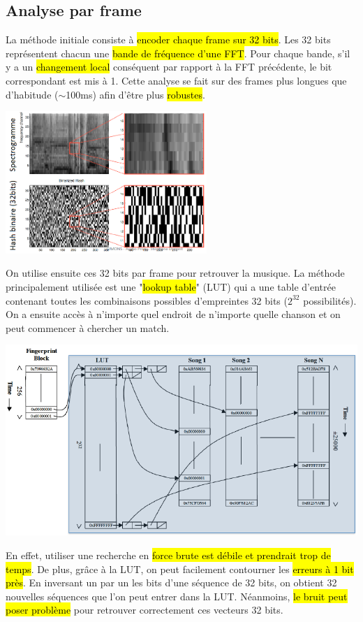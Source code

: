 \documentclass[letterpaper, 12pt]{article}
\newcommand{\alinea}{
\hspace*{0.5cm}}
\begin{document}
		\subsection{Analyse par frame}
			\alinea La méthode initiale consiste à \hl{encoder chaque frame sur 32 bits}. Les 32 bits représentent chacun une \hl{bande 
				de fréquence d'une FFT}. Pour chaque bande, s'il y a un \hl{changement local} conséquent par rapport à la FFT précédente, le 
				bit correspondant est mis à 1. Cette analyse se fait sur des frames plus longues que d'habitude ($\sim$100ms) afin 
				d'être plus \hl{robustes}.
			\begin{center}
				\includegraphics[width=3in]{Images/binary}
			\end{center}
			\alinea On utilise ensuite ces 32 bits par frame pour retrouver la musique. La méthode principalement utilisée est une 
				"\hl{lookup table}" (LUT) qui a une table d'entrée contenant toutes les combinaisons possibles d'empreintes 32 bits
				($2^32$ possibilités). On a ensuite accès à n'importe quel endroit de n'importe quelle chanson et on peut 
				commencer à chercher un match.
			\begin{center}
				\includegraphics[width=\textwidth]{Images/LUT}
			\end{center}
			\alinea En effet, utiliser une recherche en \hl{force brute est débile et prendrait trop de temps}. De plus, grâce à la LUT,
				on peut facilement contourner les \hl{erreurs à 1 bit près}. En inversant un par un les bits d'une séquence de 32 bits,
				on obtient 32 nouvelles séquences que l'on peut entrer dans la LUT. Néanmoins, \hl{le bruit peut poser problème} pour 
				retrouver correctement ces vecteurs 32 bits.
\end{document}
